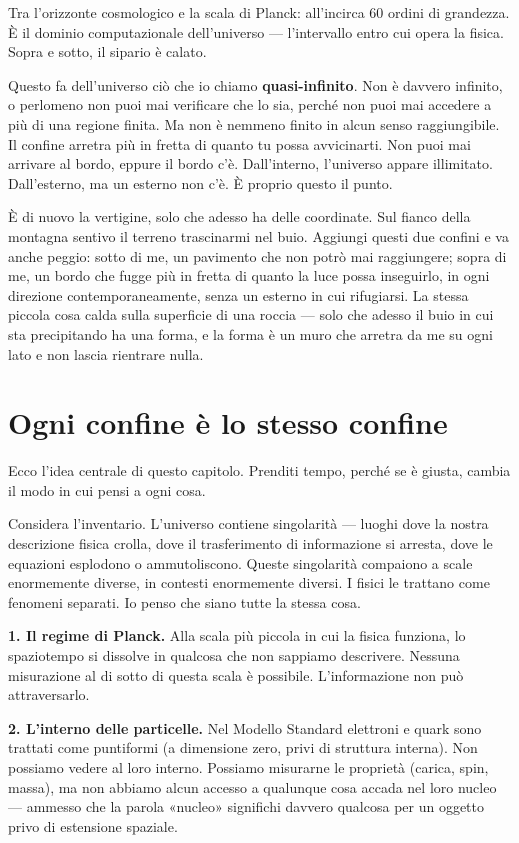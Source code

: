 \documentclass[11pt, twoside, openright]{book}
\begin{document}
Tra l'orizzonte cosmologico e la scala di Planck: all'incirca 60 ordini di grandezza. È il dominio computazionale dell'universo --- l'intervallo entro cui opera la fisica. Sopra e sotto, il sipario è calato.

Questo fa dell'universo ciò che io chiamo \textbf{quasi-infinito}. Non è davvero infinito, o perlomeno non puoi mai verificare che lo sia, perché non puoi mai accedere a più di una regione finita. Ma non è nemmeno finito in alcun senso raggiungibile. Il confine arretra più in fretta di quanto tu possa avvicinarti. Non puoi mai arrivare al bordo, eppure il bordo c'è. Dall'interno, l'universo appare illimitato. Dall'esterno, ma un esterno non c'è. È proprio questo il punto.

È di nuovo la vertigine, solo che adesso ha delle coordinate. Sul fianco della montagna sentivo il terreno trascinarmi nel buio. Aggiungi questi due confini e va anche peggio: sotto di me, un pavimento che non potrò mai raggiungere; sopra di me, un bordo che fugge più in fretta di quanto la luce possa inseguirlo, in ogni direzione contemporaneamente, senza un esterno in cui rifugiarsi. La stessa piccola cosa calda sulla superficie di una roccia --- solo che adesso il buio in cui sta precipitando ha una forma, e la forma è un muro che arretra da me su ogni lato e non lascia rientrare nulla.


\section*{Ogni confine è lo stesso confine}

Ecco l'idea centrale di questo capitolo. Prenditi tempo, perché se è giusta, cambia il modo in cui pensi a ogni cosa.

Considera l'inventario. L'universo contiene singolarità --- luoghi dove la nostra descrizione fisica crolla, dove il trasferimento di informazione si arresta, dove le equazioni esplodono o ammutoliscono. Queste singolarità compaiono a scale enormemente diverse, in contesti enormemente diversi. I fisici le trattano come fenomeni separati. Io penso che siano tutte la stessa cosa.

\textbf{1. Il regime di Planck.} Alla scala più piccola in cui la fisica funziona, lo spaziotempo si dissolve in qualcosa che non sappiamo descrivere. Nessuna misurazione al di sotto di questa scala è possibile. L'informazione non può attraversarlo.

\textbf{2. L'interno delle particelle.} Nel Modello Standard elettroni e quark sono trattati come puntiformi (a dimensione zero, privi di struttura interna). Non possiamo vedere al loro interno. Possiamo misurarne le proprietà (carica, spin, massa), ma non abbiamo alcun accesso a qualunque cosa accada nel loro nucleo --- ammesso che la parola «nucleo» significhi davvero qualcosa per un oggetto privo di estensione spaziale.
\end{document}
